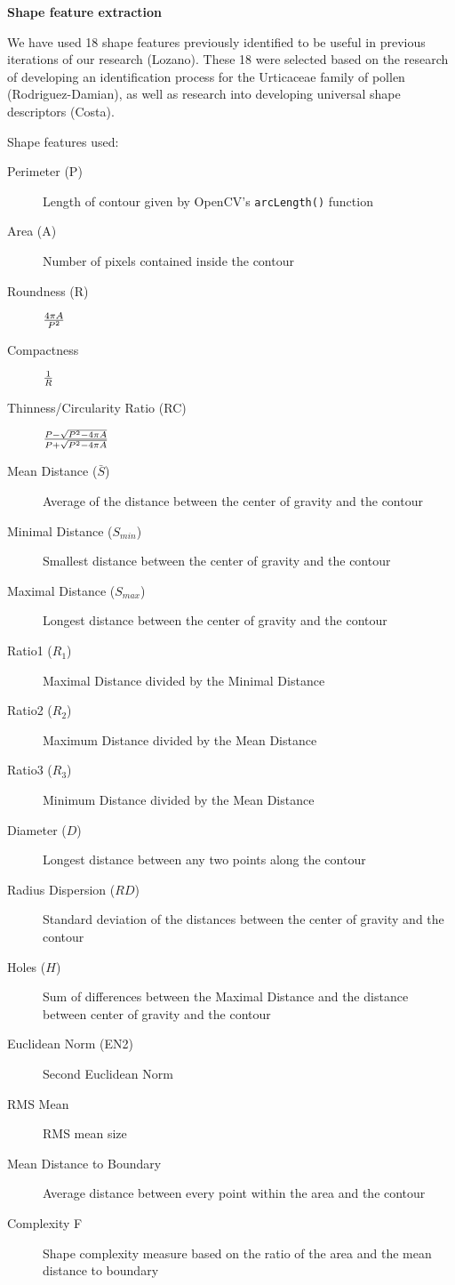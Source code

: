 \textbf{Shape feature extraction}

We have used 18 shape features previously identified to be useful in previous iterations of our research (Lozano). These 18 were selected based on the research of developing an identification process for the Urticaceae family of pollen (Rodriguez-Damian), as well as research into developing universal shape descriptors (Costa).

Shape features used:

\begin{description}
\item[Perimeter (P)] Length of contour given by OpenCV's \verb|arcLength()| function
\item[Area (A)] Number of pixels contained inside the contour
\item[Roundness (R)] $4\pi A \over P^2$
\item[Compactness] $1 \over R$
\item[Thinness/Circularity Ratio (RC)] $P-\sqrt{P^2-4\pi A} \over P+\sqrt{P^2-4\pi A}$
\item[Mean Distance ($\bar{S}$)] Average of the distance between the center of gravity and the contour
\item[Minimal Distance ($S_{min}$)] Smallest distance between the center of gravity and the contour
\item[Maximal Distance ($S_{max}$)] Longest distance between the center of gravity and the contour
\item[Ratio1 ($R_1$)] Maximal Distance divided by the Minimal Distance
\item[Ratio2 ($R_2$)] Maximum Distance divided by the Mean Distance
\item[Ratio3 ($R_3$)] Minimum Distance divided by the Mean Distance
\item[Diameter ($D$)] Longest distance between any two points along the contour
\item[Radius Dispersion ($RD$)] Standard deviation of the distances between the center of gravity and the contour
\item[Holes ($H$)] Sum of differences between the Maximal Distance and the distance between center of gravity and the contour
\item[Euclidean Norm (EN2)] Second Euclidean Norm
\item[RMS Mean] RMS mean size
\item[Mean Distance to Boundary] Average distance between every point within the area and the contour
\item[Complexity F] Shape complexity measure based on the ratio of the area and the mean distance to boundary
\end{description}



  
  